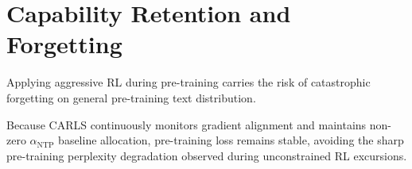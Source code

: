\section{Capability Retention and Forgetting}
\label{sec:retention}

Applying aggressive RL during pre-training carries the risk of catastrophic forgetting on general pre-training text distribution.

Because CARLS continuously monitors gradient alignment and maintains non-zero $\alpha_{\text{NTP}}$ baseline allocation, pre-training loss remains stable, avoiding the sharp pre-training perplexity degradation observed during unconstrained RL excursions.
